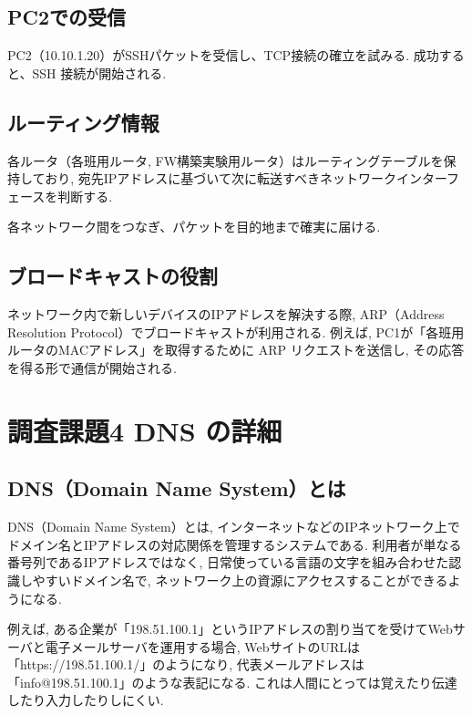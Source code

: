 \documentclass{ltjsarticle} %
\begin{document}
\subsection{PC2での受信}
PC2（10.10.1.20）がSSHパケットを受信し、TCP接続の確立を試みる. 
成功すると、SSH 接続が開始される. 

\subsection{ルーティング情報}
各ルータ（各班用ルータ, FW構築実験用ルータ）はルーティングテーブルを保持しており, 
宛先IPアドレスに基づいて次に転送すべきネットワークインターフェースを判断する. 

各ネットワーク間をつなぎ、パケットを目的地まで確実に届ける. 

\subsection{ブロードキャストの役割}
ネットワーク内で新しいデバイスのIPアドレスを解決する際, ARP（Address Resolution Protocol）でブロードキャストが利用される. 
例えば, PC1が「各班用ルータのMACアドレス」を取得するために ARP リクエストを送信し, その応答を得る形で通信が開始される. 



\section{調査課題4 DNS の詳細}

\subsection{DNS（Domain Name System）とは}
DNS（Domain Name System）とは, インターネットなどのIPネットワーク上でドメイン名とIPアドレスの対応関係を管理するシステムである. 
利用者が単なる番号列であるIPアドレスではなく, 日常使っている言語の文字を組み合わせた認識しやすいドメイン名で, 
ネットワーク上の資源にアクセスすることができるようになる. 

\vspace{0.5cm}

例えば, ある企業が「198.51.100.1」というIPアドレスの割り当てを受けてWebサーバと電子メールサーバを運用する場合, 
WebサイトのURLは「https://198.51.100.1/」のようになり, 代表メールアドレスは「info@198.51.100.1」のような表記になる. 
これは人間にとっては覚えたり伝達したり入力したりしにくい. 

\vspace{0.5cm}
\end{document}
